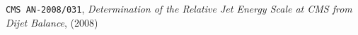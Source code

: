 \documentclass[a4paper]{cmspaper} %
\begin{document}




\appendix
\begin{thebibliography}{9}
 \texttt{CMS AN-2008/031}, \textit{Determination of the Relative Jet Energy Scale at CMS from Dijet Balance}, (2008)
\end{thebibliography}
\end{document}
